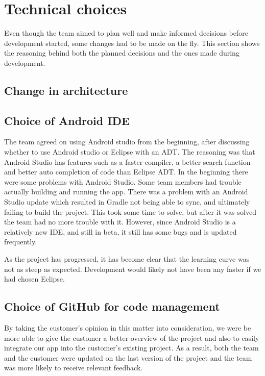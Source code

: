 \section{Technical choices}
Even though the team aimed to plan well and make informed decisions before development started, some changes had to be made on the fly. This section shows the reasoning behind both the planned decisions and the ones made during development.

\subsection{Change in architecture}

\subsection{Choice of Android IDE}
The team agreed on using Android studio from the beginning, after discussing whether to use Android studio or Eclipse with an ADT. The reasoning was that Android Studio has features such as a faster compiler, a better search function and better auto completion of code than Eclipse ADT. In the beginning there were some problems with Android Studio. Some team members had trouble actually building and running the app. There was a problem with an Android Studio update which resulted in Gradle not being able to sync, and ultimately failing to build the project. This took some time to solve, but after it was solved the team had no more trouble with it. However, since Android Studio is a relatively new IDE, and still in beta, it still has some bugs and is updated frequently.

As the project has progressed, it has become clear that the learning curve was not as steep as expected. Development would likely not have been any faster if we had chosen Eclipse.

\subsection{Choice of GitHub for code management}
By taking the customer's opinion in this matter into consideration, we were be more able to give the customer a better overview of the project and also to easily integrate our app into the customer's existing project. As a result, both the team and the customer were updated on the last version of the project and the team was more likely to receive relevant feedback. 